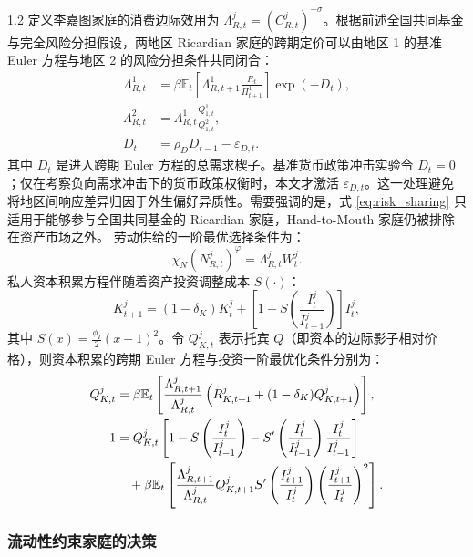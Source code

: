 \documentclass[12pt,UTF8]{ctexart}
\newcommand{\E}{\mathbb{E}}
\begin{document}
\begin{spacing}{1.2}
		定义李嘉图家庭的消费边际效用为 $\Lambda_{R,t}^j=(C_{R,t}^j)^{-\sigma}$。根据前述全国共同基金与完全风险分担假设，两地区 Ricardian 家庭的跨期定价可以由地区 1 的基准 Euler 方程与地区 2 的风险分担条件共同闭合：
		\begin{align}
			\Lambda_{R,t}^1 &=\beta \E_t\left[\Lambda_{R,t+1}^1\frac{R_t}{\Pi_{t+1}^1}\right]\exp(-D_t), \label{eq:euler_rf} \\
			\Lambda_{R,t}^2 &=\Lambda_{R,t}^1\frac{Q_{1,t}^1}{Q_{1,t}^2},
			\label{eq:risk_sharing}\\
			D_t&=\rho_DD_{t-1}-\varepsilon_{D,t}.
			\label{eq:demand_process}
		\end{align}
		其中 $D_t$ 是进入跨期 Euler 方程的总需求楔子。基准货币政策冲击实验令 $D_t=0$；仅在考察负向需求冲击下的货币政策权衡时，本文才激活 $\varepsilon_{D,t}$。这一处理避免将地区间响应差异归因于外生偏好异质性。需要强调的是，式 \eqref{eq:risk_sharing} 只适用于能够参与全国共同基金的 Ricardian 家庭，Hand-to-Mouth 家庭仍被排除在资产市场之外。
		劳动供给的一阶最优选择条件为：
		\begin{equation}
			\chi_N(N_{R,t}^j)^{\varphi}=\Lambda_{R,t}^j W_t^j.
			\label{eq:labor_R}
		\end{equation}
		私人资本积累方程伴随着资产投资调整成本 $S(\cdot)$：
		\begin{equation}
			K_{t+1}^j=(1-\delta_K)K_t^j+
			\left[1-S\left(\frac{I_t^j}{I_{t-1}^j}\right)\right]I_t^j,
			\label{eq:K_law}
		\end{equation}
		其中 $S(x)=\frac{\phi_I}{2}(x-1)^2$。令 $Q_{K,t}^j$ 表示托宾 $Q$（即资本的边际影子相对价格），则资本积累的跨期 Euler 方程与投资一阶最优化条件分别为：
		\begin{align}
			Q_{K,t}^j &=\beta\E_t\left[
			\frac{\Lambda_{R,t+1}^j}{\Lambda_{R,t}^j}
			\left(R_{K,t+1}^j+(1-\delta_K)Q_{K,t+1}^j\right)
			\right], \label{eq:euler_capital}\\
			1 &=Q_{K,t}^j
			\left[
			1-S\left(\frac{I_t^j}{I_{t-1}^j}\right)
			-S'\left(\frac{I_t^j}{I_{t-1}^j}\right)\frac{I_t^j}{I_{t-1}^j}
			\right] \notag \\
			&\quad +\beta\E_t\left[
			\frac{\Lambda_{R,t+1}^j}{\Lambda_{R,t}^j}
			Q_{K,t+1}^j
			S'\left(\frac{I_{t+1}^j}{I_t^j}\right)
			\left(\frac{I_{t+1}^j}{I_t^j}\right)^2
			\right].
			\label{eq:inv_foc}
		\end{align}
		
		\subsubsection{流动性约束家庭的决策}
		

\end{spacing}
\end{document}
